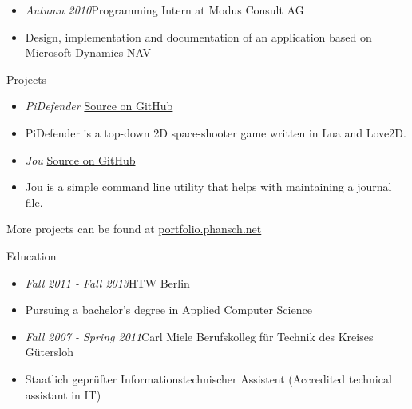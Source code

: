 \documentclass[12pt]{article}
\begin{document}
\begin{itemize}
  \setlength{\itemsep}{0cm}
  \setlength{\parskip}{0cm}

  \item[] \emph{Autumn 2010}\hfill Programming Intern at Modus Consult AG
  \item[] Design, implementation and documentation of an application based on Microsoft Dynamics NAV
\end{itemize}

\vspace{0.5cm}
{\Large Projects}

\begin{itemize}
  \setlength{\itemsep}{0cm}
  \setlength{\parskip}{0cm}
  \item[] \emph{PiDefender} \hfill \href{https://github.com/phansch/PiDefender}{Source on GitHub}

  \item[] PiDefender is a top-down 2D space-shooter game written in Lua and Love2D.
\end{itemize}


\begin{itemize}
  \setlength{\itemsep}{0cm}
  \setlength{\parskip}{0cm}
  \item[] \emph{Jou} \hfill \href{https://github.com/phansch/jou}{Source on GitHub}

  \item[] Jou is a simple command line utility that helps with maintaining a journal file.

\end{itemize}

More projects can be found at \href{http://phansch.net/portfolio/#folio-overview}{portfolio.phansch.net}

\vspace{0.5cm}
{\Large Education}

\begin{itemize}
  \setlength{\itemsep}{0cm}
  \setlength{\parskip}{0.1cm}
  \item[] \emph{Fall 2011 - Fall 2013}\hfill HTW Berlin
  \item[] Pursuing a bachelor's degree in Applied Computer Science
\end{itemize}

\begin{itemize}
  \setlength{\itemsep}{0cm}
  \setlength{\parskip}{0.1cm}
  \item[] \emph{Fall 2007 - Spring 2011}\hfill Carl Miele Berufskolleg für Technik des Kreises Gütersloh
  \item[] Staatlich geprüfter Informationstechnischer Assistent (Accredited technical assistant in IT)
\end{itemize}
\end{document}
